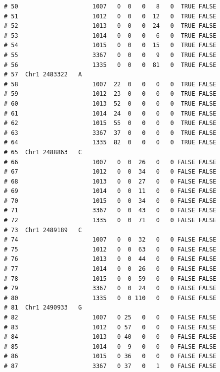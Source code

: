 \documentclass{article}\usepackage[]{graphicx}\usepackage[]{color}
\makeatletter
\newenvironment{kframe}{%
 \def\at@end@of@kframe{}%
 \ifinner\ifhmode%
  \def\at@end@of@kframe{\end{minipage}}%
  \begin{minipage}{\columnwidth}%
 \fi\fi%
 \def\FrameCommand##1{\hskip\@totalleftmargin \hskip-\fboxsep
 \colorbox{shadecolor}{##1}\hskip-\fboxsep
     \hskip-\linewidth \hskip-\@totalleftmargin \hskip\columnwidth}%
 \MakeFramed {\advance\hsize-\width
   \@totalleftmargin\z@ \linewidth\hsize
   \@setminipage}}%
 {\par\unskip\endMakeFramed%
 \at@end@of@kframe}
\newenvironment{knitrout}{}{} %
\makeatother
\begin{document}
\begin{knitrout}
\begin{kframe}
\begin{verbatim}
# 50                     1007   0  0   0   8   0  TRUE FALSE        
# 51                     1012   0  0   0  12   0  TRUE FALSE        
# 52                     1013   0  0   0  24   0  TRUE FALSE        
# 53                     1014   0  0   0   6   0  TRUE FALSE        
# 54                     1015   0  0   0  15   0  TRUE FALSE        
# 55                     3367   0  0   0   9   0  TRUE FALSE        
# 56                     1335   0  0   0  81   0  TRUE FALSE        
# 57  Chr1 2483322   A                                              
# 58                     1007  22  0   0   0   0  TRUE FALSE        
# 59                     1012  23  0   0   0   0  TRUE FALSE        
# 60                     1013  52  0   0   0   0  TRUE FALSE        
# 61                     1014  24  0   0   0   0  TRUE FALSE        
# 62                     1015  55  0   0   0   0  TRUE FALSE        
# 63                     3367  37  0   0   0   0  TRUE FALSE        
# 64                     1335  82  0   0   0   0  TRUE FALSE        
# 65  Chr1 2488863   C                                              
# 66                     1007   0  0  26   0   0 FALSE FALSE        
# 67                     1012   0  0  34   0   0 FALSE FALSE        
# 68                     1013   0  0  27   0   0 FALSE FALSE        
# 69                     1014   0  0  11   0   0 FALSE FALSE        
# 70                     1015   0  0  34   0   0 FALSE FALSE        
# 71                     3367   0  0  43   0   0 FALSE FALSE        
# 72                     1335   0  0  71   0   0 FALSE FALSE        
# 73  Chr1 2489189   C                                              
# 74                     1007   0  0  32   0   0 FALSE FALSE        
# 75                     1012   0  0  63   0   0 FALSE FALSE        
# 76                     1013   0  0  44   0   0 FALSE FALSE        
# 77                     1014   0  0  26   0   0 FALSE FALSE        
# 78                     1015   0  0  59   0   0 FALSE FALSE        
# 79                     3367   0  0  24   0   0 FALSE FALSE        
# 80                     1335   0  0 110   0   0 FALSE FALSE        
# 81  Chr1 2490933   G                                              
# 82                     1007   0 25   0   0   0 FALSE FALSE        
# 83                     1012   0 57   0   0   0 FALSE FALSE        
# 84                     1013   0 40   0   0   0 FALSE FALSE        
# 85                     1014   0  9   0   0   0 FALSE FALSE        
# 86                     1015   0 36   0   0   0 FALSE FALSE        
# 87                     3367   0 37   0   1   0 FALSE FALSE        

\end{verbatim}
\end{kframe}
\end{knitrout}
\end{document}
